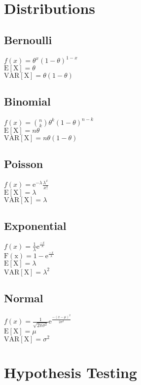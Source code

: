 \documentclass{article}
\begin{document}
\section{Distributions}

\subsection{Bernoulli}

$f(x)=\theta^x(1-\theta)^{1-x}$\\
$\mathrm{E[X]}=\theta$\\
$\mathrm{VAR[X]}=\theta(1-\theta)$

\subsection{Binomial}

$f(x)=\binom{n}{k}\theta^k(1-\theta)^{n-k}$\\
$\mathrm{E[X]}=n\theta$\\
$\mathrm{VAR[X]}=n\theta(1-\theta)$

\subsection{Poisson}
$f(x)=\mathrm{e}^{-\lambda}\frac{\lambda^x}{x!}$\\
$\mathrm{E[X]}=\lambda$\\
$\mathrm{VAR[X]}=\lambda$

\subsection{Exponential}
$f(x)=\frac{1}{\lambda}\mathrm{e}^{\frac{-x}{\lambda}}$\\
$\mathrm{F(x)}=1-\mathrm{e}^{\frac{-x}{\lambda}}$\\
$\mathrm{E[X]}=\lambda$\\
$\mathrm{VAR[X]}=\lambda^2$

\subsection{Normal}
$f(x)=\frac{1}{\sqrt{2\pi\sigma^2}}\mathrm{e}^{\frac{-(x-\mu)^2}{2\sigma^2}}$\\
$\mathrm{E[X]}=\mu$\\
$\mathrm{VAR[X]}=\sigma^2$

\section{Hypothesis Testing}
\end{document}
